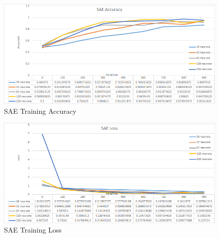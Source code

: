 \documentclass[draft,dvipsnames]{drexel-thesis}
\begin{document}
\begin{thesis}
\begin{figure}[t!]
    \centering
    \includegraphics[width=\textwidth]{pictures/result_pictures/SAE_Accuracy.png}
    \caption{SAE Training Accuracy}
    \label{fig:sae_accuracy}
\end{figure}

\begin{figure}[t!]
    \centering
    \includegraphics[width=\textwidth]{pictures/result_pictures/SAE_Loss.png}
    \caption{SAE Training Loss}
    \label{fig:sae_loss}
\end{figure}


\end{thesis}
\end{document}
